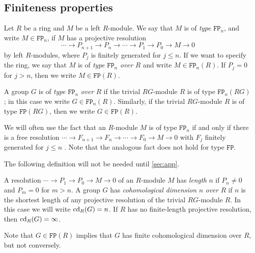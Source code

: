 \documentclass[11pt, letterpaper]{amsart}
\begin{document}
\subsection{Finiteness properties}

\begin{defn}
Let $R$ be a ring and $M$ be a left $R$-module. We say that $M$ is of \textit{type $\mathtt{FP}_n$}, and write $M \in \mathtt{FP}_n$, if $M$ has a projective resolution
\[
\cdots \longrightarrow P_{n+1} \longrightarrow P_n \longrightarrow \cdots \longrightarrow P_1 \longrightarrow P_0 \longrightarrow M \longrightarrow 0
\]
by left $R$-modules, where $P_j$ is finitely generated for $j \leqslant n$. If we want to specify the ring, we say that $M$ is of \textit{type $\mathtt{FP}_n$ over $R$} and write $M \in \mathtt{FP}_n(R)$.  If $P_j = 0$ for $j > n$, then we write $M \in \mathtt{FP}(R)$.

A group $G$ is of \textit{type $\mathtt{FP}_n$ over $R$} if the trivial $RG$-module $R$ is of type $\mathtt{FP}_n(RG)$; in this case we write $G \in \mathtt{FP}_n(R)$. Similarly, if the trivial $RG$-module $R$ is of type $\mathtt{FP}(RG)$, then we write $G \in \mathtt{FP}(R)$.
\end{defn}

We will often use the fact that an $R$-module $M$ is of type $\mathtt{FP}_n$ if and only if there is a free resolution $\cdots \longrightarrow F_{n+1} \longrightarrow F_n \longrightarrow \cdots \longrightarrow F_0 \longrightarrow M \longrightarrow 0$ with $F_j$ finitely generated for $j \leqslant n$ \cite[VIII Proposition 4.3]{BrownGroupCohomology}. Note that the analogous fact does not hold for type $\mathtt{FP}$.

The following definition will not be needed until \cref{sec:app}.

\begin{defn}
A resolution $\cdots \longrightarrow P_1 \longrightarrow P_0 \longrightarrow M \longrightarrow 0$ of an $R$-module $M$ has \textit{length} $n$ if $P_n \neq 0$ and $P_m = 0$ for $m > n$. A group $G$ has \textit{cohomological dimension $n$ over $R$} if $n$ is the shortest length of any projective resolution of the trivial $RG$-module $R$. In this case we will write $\operatorname{cd}_R (G) = n$. If $R$ has no finite-length projective resolution, then $\operatorname{cd}_R(G) = \infty$.
\end{defn}

Note that $G \in \mathtt{FP}(R)$ implies that $G$ has finite cohomological dimension over $R$, but not conversely.
\end{document}
